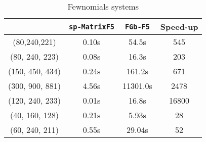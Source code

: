 \documentclass[12pt]{article}
\numberwithin{equation}{section}
\numberwithin{theorem}{section}
\begin{document}
\begin{table}
  \centering
  \begin{tabular}{|c||c|c||c|}
\hline
 & {\tt sp-MatrixF5} & {\tt FGb-F5} &Speed-up \\
\hline
\hline
(80,240,221)&0.10s & 54.5s&545\\
(80,      240,     223)&           0.08s&               16.3s&203\\        
(150,     450,     434)&           0.24s&              161.2s&671\\
(300,     900,     881)&          4.56s&              11301.0s&2478\\
(120,     240,     233)&           0.01s&               16.8s&16800\\
(40,      160,     128)&            0.21s&               5.93s&28\\
(60,      240,     211)&            0.55s&              29.04s&52\\
\hline
  \end{tabular}
  \caption{Fewnomials systems}\label{table:fewnomials}
\end{table}
\end{document}
